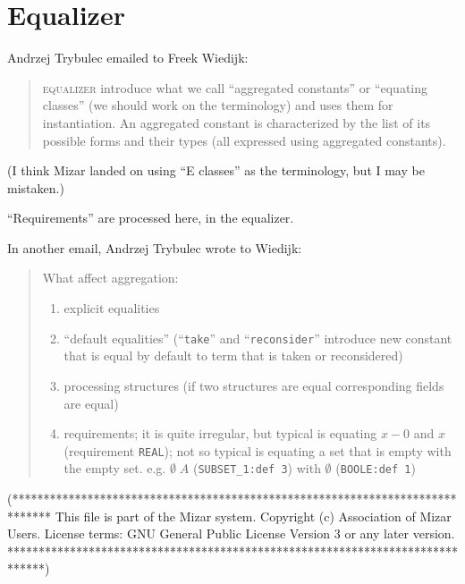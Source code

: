 
\chapter{Equalizer}

Andrzej Trybulec emailed to Freek Wiedijk:
\begin{quote}
\textsc{equalizer} introduce what we call ``aggregated constants'' or
``equating classes'' (we should work on the terminology) and uses them
for instantiation.  An aggregated constant is characterized by the list
of its possible forms and their types (all expressed using aggregated
constants).
\end{quote}

(I think Mizar landed on using ``E classes'' as the terminology, but I
may be mistaken.)

``Requirements'' are processed here, in the equalizer.

In another email, Andrzej Trybulec wrote to Wiedijk:
\begin{quotation}
  What affect aggregation:
  \begin{enumerate}
  \item  explicit equalities
  \item
    ``default equalities'' (``{\tt take}'' and ``{\tt reconsider}'' introduce new constant that
is equal by default to term that is taken or reconsidered)
\item processing structures (if two structures are equal corresponding fields are
equal)
\item requirements; it is quite irregular, but typical is equating $x-0$ and $x$
(requirement {\tt REAL}); not so typical is equating a set that is empty with the
empty set. e.g. $\emptyset\;A$ (\verb#SUBSET_1:def 3#) with $\emptyset$ (\verb#BOOLE:def 1#)
  \end{enumerate}
\end{quotation}

\nwenddocs{}\endmoddef\nwstartdeflinemarkup\nwenddeflinemarkup
(******************************************************************************
   This file is part of the Mizar system.
   Copyright (c) Association of Mizar Users.
   License terms: GNU General Public License Version 3 or any later version.
******************************************************************************)

